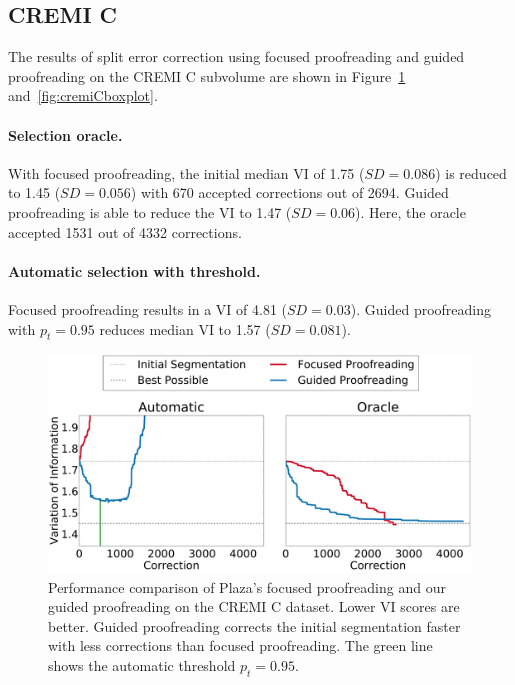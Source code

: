 \subsection{CREMI C}

The results of split error correction using focused proofreading and guided proofreading on the CREMI C subvolume are shown in Figure~\ref{fig:cremiCtrails} and~\ref{fig:cremiCboxplot}.

\paragraph{Selection oracle.} With focused proofreading, the initial median VI of 1.75 ($SD=0.086$) is reduced to 1.45 ($SD=0.056$) with 670 accepted corrections out of 2694. Guided proofreading is able to reduce the VI to 1.47 ($SD=0.06$). Here, the oracle accepted 1531 out of 4332 corrections. 

\paragraph{Automatic selection with threshold.} Focused proofreading results in a VI of 4.81 ($SD=0.03$). Guided proofreading with $p_t=0.95$ reduces median VI to 1.57 ($SD=0.081$).

\begin{figure}[t]
\centering
\includegraphics[width=\linewidth]{gfx/cremiC_trails.pdf}
\caption{Performance comparison of Plaza's focused proofreading and our guided proofreading on the CREMI C dataset. Lower VI scores are better. Guided proofreading corrects the initial segmentation faster with less corrections than focused proofreading. The green line shows the automatic threshold $p_t=0.95$.}
\label{fig:cremiCtrails}
\end{figure}

